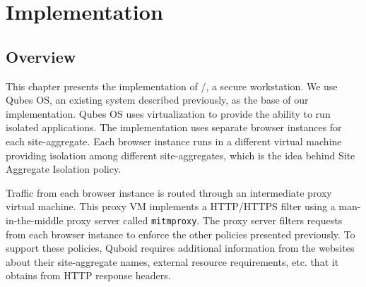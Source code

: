 \chapter{Implementation} \label{chap:implementation}

\section{Overview}

This chapter presents the implementation of \namesecureworkstation/, a secure workstation. We use Qubes OS, an existing system described previously, as the base of our implementation. Qubes OS uses virtualization to provide the ability to run isolated applications. The implementation uses separate browser instances for each site-aggregate. Each browser instance runs in a different virtual machine providing isolation among different site-aggregates, which is the idea behind Site Aggregate Isolation policy.

Traffic from each browser instance is routed through an intermediate proxy virtual machine. This proxy VM implements a HTTP/HTTPS filter using a man-in-the-middle proxy server called {\tt mitmproxy}. The proxy server filters requests from each browser instance to enforce the other policies presented previously. To support these policies, Quboid requires additional information from the websites about their site-aggregate names, external resource requirements, etc. that it obtains from HTTP response headers.



